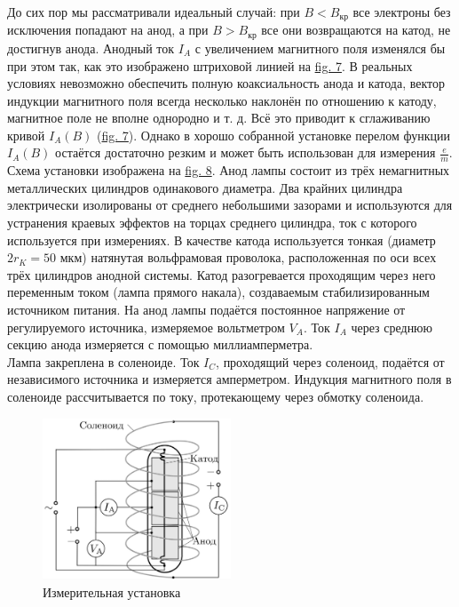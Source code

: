 \documentclass[a4paper]{article}
\begin{document}
До сих пор мы рассматривали идеальный случай: при $B<B_{\text{кр}}$ все электроны без исключения попадают на анод, а при $B > B_{\text{кр}}$ все они возвращаются на катод, не достигнув анода. Анодный ток $I_A$ с увеличением магнитного поля изменялся бы при этом так, как это изображено штриховой линией на \hyperref[IA(B)]{fig. 7}. В реальных условиях невозможно обеспечить полную коаксиальность анода и катода, вектор индукции магнитного поля всегда несколько наклонён по отношению к катоду, магнитное поле не вполне однородно и т. д. Всё это приводит к сглаживанию кривой $I_A(B)$ (\hyperref[IA(B)]{fig. 7}). Однако в хорошо собранной установке перелом функции $I_A(B)$ остаётся достаточно резким и может быть использован для измерения $\frac{e}{m}$. Схема установки изображена на \hyperref[MethMagnetron]{fig. 8}. Анод лампы состоит из трёх немагнитных металлических цилиндров одинакового диаметра. Два крайних цилиндра электрически изолированы от среднего неболь­шими зазорами и используются для устранения краевых эффектов на торцах среднего цилиндра, ток с которого используется при измерени­ях. В качестве катода используется тонкая (диаметр $2r_K = 50$ мкм) натянутая вольфрамовая проволока, расположенная по оси всех трёх цилиндров анодной системы. Катод разогревается проходящим через него переменным током (лампа прямого накала), создаваемым стабилизиро­ванным источником питания. На анод лампы подаётся постоянное напря­жение от регулируемого источника, измеряемое вольтметром $V_A$. Ток $I_A$ через среднюю секцию анода измеряется с помощью миллиамперметра.\\
Лампа закреплена в соленоиде. Ток $I_C$, проходящий через соленоид, подаётся от независимого источника и измеряется амперметром. Индук­ция магнитного поля в соленоиде рассчитывается по току, протекающе­му через обмотку соленоида.

\begin{figure}[h]
	\begin{center}
		\includegraphics[width = 0.5\textwidth]{Метод2}
		\caption{Измерительная установка}
	\end{center}
\label{MethMagnetron}
\end{figure}
\end{document}
